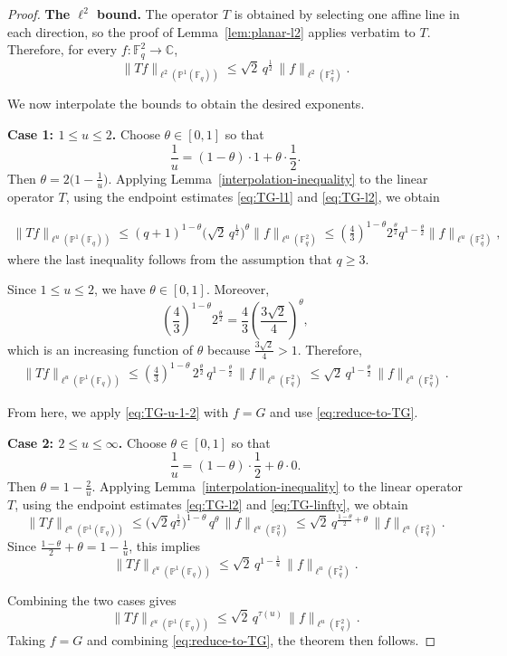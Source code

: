 \documentclass[11pt]{article}
\newcommand{\1}{\mathbf 1}
\begin{document}
\begin{proof}
\medskip
\noindent\textbf{The $\ell^2$ bound.}
The operator $T$ is obtained by selecting one affine line in each direction,
so the proof of Lemma~\ref{lem:planar-l2} applies verbatim to $T$.
Therefore, for every $f:\mathbb{F}_q^2\to\mathbb{C}$,
\begin{equation}\label{eq:TG-l2}
\|T f\|_{\ell^2(\mathbb{P}^1(\mathbb{F}_q))}
\le
\sqrt{2}\,q^{\frac12}\,\|f\|_{\ell^2(\mathbb{F}_q^2)}.
\end{equation}

We now interpolate the bounds to obtain the desired exponents.

\medskip
\noindent\textbf{Case 1: $1\le u\le 2$.}
Choose $\theta\in[0,1]$ so that
\[
\frac1u=(1-\theta)\cdot 1+\theta\cdot\frac12.
\]
Then $\theta=2\bigl(1-\frac1u\bigr)$.
Applying Lemma~\ref{interpolation-inequality} to the linear operator $T$,
using the endpoint estimates \eqref{eq:TG-l1} and \eqref{eq:TG-l2}, we obtain
{ 
\begin{align*}
\|Tf\|_{\ell^u(\mathbb{P}^1(\mathbb{F}_q))}
\le
(q+1)^{1-\theta}\bigl(\sqrt{2}\,q^{\frac12}\bigr)^{\theta}
\|f\|_{\ell^u(\mathbb{F}_q^2)} 
\le
\left(\frac43\right)^{1-\theta}
2^{\frac{\theta}{2}}
q^{1-\frac{\theta}{2}}
\|f\|_{\ell^u(\mathbb{F}_q^2)},
\end{align*}
where the last inequality follows from the assumption that $q\ge 3$.

Since $1\le u\le2$, we have $\theta\in[0,1]$. Moreover,
\[
\left(\frac43\right)^{1-\theta}2^{\frac{\theta}{2}}
=
\frac43\left(\frac{3\sqrt2}{4}\right)^\theta,
\]
which is an increasing function of $\theta$ because $\frac{3\sqrt2}{4}>1$.
Therefore,
\begin{align}
\label{eq:TG-u-1-2}
\|Tf\|_{\ell^u(\mathbb{P}^1(\mathbb{F}_q))}
\le
\left(\frac43\right)^{1-\theta} \, 
2^{\frac{\theta}{2}} \, 
q^{1-\frac{\theta}{2}} \, 
\|f\|_{\ell^u(\mathbb{F}_q^2)}
\le
\sqrt{2}\,
q^{1-\frac{\theta}{2}} \, 
\|f\|_{\ell^u(\mathbb{F}_q^2)}.
\end{align}
}
From here, we apply \eqref{eq:TG-u-1-2} with $f=G$ and use \eqref{eq:reduce-to-TG}.



\medskip
\noindent\textbf{Case 2: $2\le u\le \infty$.}
Choose $\theta\in[0,1]$ so that
\[
\frac1u=(1-\theta)\cdot\frac12+\theta\cdot 0.
\]
Then $\theta=1-\frac{2}{u}$.
Applying Lemma~\ref{interpolation-inequality} to the linear operator $T$,
using the endpoint estimates \eqref{eq:TG-l2} and \eqref{eq:TG-linfty}, we obtain 
\[
\|T f\|_{\ell^u(\mathbb{P}^1(\mathbb{F}_q))}
\le
\bigl(\sqrt{2}q^{\frac12}\bigr)^{1-\theta}\,q^{\theta}\,
\|f\|_{\ell^u(\mathbb{F}_q^2)}
\leq \sqrt{2}
\,q^{\frac{1-\theta}{2}+\theta}\,\|f\|_{\ell^u(\mathbb{F}_q^2)}.
\]
Since $\frac{1-\theta}{2}+\theta=1-\frac1u$, this implies
\[
\|T f\|_{\ell^u(\mathbb{P}^1(\mathbb{F}_q))}
\le \sqrt{2} \,q^{1-\frac1u}\,\|f\|_{\ell^u(\mathbb{F}_q^2)}.
\]

Combining the two cases gives
\[
\|T f\|_{\ell^u(\mathbb{P}^1(\mathbb{F}_q))}
\le \sqrt{2}  \,q^{\tau(u)}\,\|f\|_{\ell^u(\mathbb{F}_q^2)}.
\]
Taking $f=G$ and combining \eqref{eq:reduce-to-TG}, the theorem then follows.
\end{proof}
\end{document}

